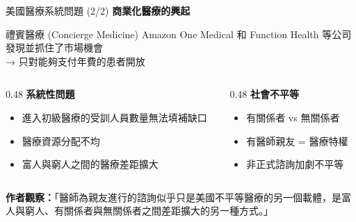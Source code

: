 \documentclass[aspectratio=169]{beamer}
\begin{document}
\begin{frame}{美國醫療系統問題 (2/2)}
\textbf{\textcolor{medred}{商業化醫療的興起}}

\begin{block}{禮賓醫療 (Concierge Medicine)}
Amazon One Medical 和 Function Health 等公司發現並抓住了市場機會\\
\textcolor{medred}{→ 只對能夠支付年費的患者開放}
\end{block}

\vspace{0.5cm}

\begin{columns}
\begin{column}{0.48\textwidth}
\textbf{\textcolor{medblue}{系統性問題}}
\begin{itemize}
\item 進入初級醫療的受訓人員數量無法填補缺口
\item 醫療資源分配不均
\item 富人與窮人之間的醫療差距擴大
\end{itemize}
\end{column}

\begin{column}{0.48\textwidth}
\textbf{\textcolor{medblue}{社會不平等}}
\begin{itemize}
\item 有關係者 vs 無關係者
\item 有醫師親友 = 醫療特權
\item 非正式諮詢加劇不平等
\end{itemize}
\end{column}
\end{columns}

\vspace{0.5cm}
\textbf{\textcolor{medred}{作者觀察：}}「醫師為親友進行的諮詢似乎只是美國不平等醫療的另一個載體，是富人與窮人、有關係者與無關係者之間差距擴大的另一種方式。」
\end{frame}
\end{document}
